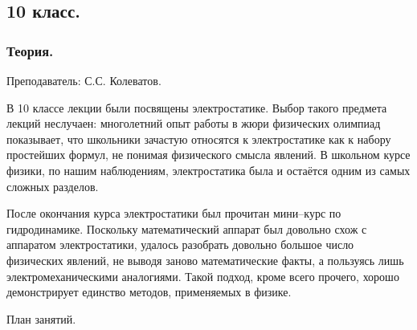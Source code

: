 \documentclass[12pt,a4paper,oneside]{scrartcl}
\begin{document}
\subsection{10 класс.}
\label{sec:daily_10}

\subsubsection{Теория.}
\label{sec:daily_10_th}

\textsf{Преподаватель: С.С. Колеватов.}

В 10 классе лекции были посвящены электростатике. Выбор такого
предмета лекций неслучаен: многолетний опыт работы в жюри физических
олимпиад показывает, что школьники зачастую относятся к электростатике
как к набору простейших формул, не понимая физического смысла
явлений. В школьном курсе физики, по нашим наблюдениям, электростатика
была и остаётся одним из самых сложных разделов.

После окончания курса электростатики был прочитан мини–курс по
гидродинамике. Поскольку математический аппарат был довольно схож с
аппаратом электростатики, удалось разобрать довольно большое число
физических явлений, не выводя заново математические факты, а пользуясь
лишь электромеханическими аналогиями. Такой подход, кроме всего
прочего, хорошо демонстрирует единство методов, применяемых в физике. 

\begin{center}
  \textsf{План занятий.}
\end{center}
\end{document}
